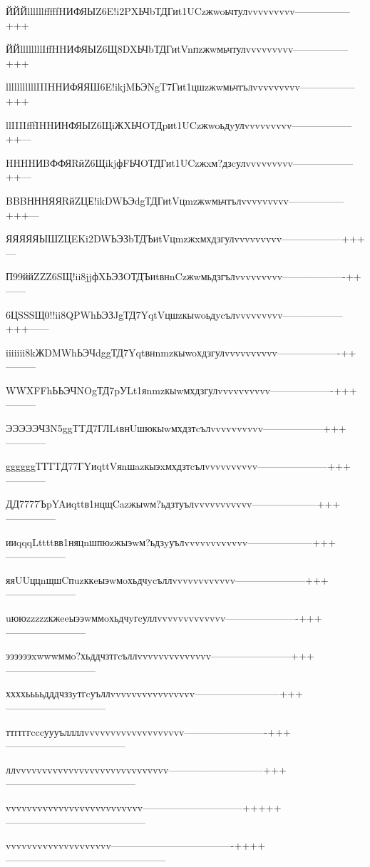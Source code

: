 \documentclass{article}
\begin{document}
 

ЙЙЙllllllfffffHИФЯЫZ6E!i2PXЬЧbТДГиt1UCzжwoьчтулvvvvvvvvv-----------------+++

ЙЙllllllllIffHHИФЯЫZ6Щ8DXЬЧbТДГиtVnпzжwмьчтулvvvvvvvvv-----------------+++

lllllllllllIIIHHИФЯЯШ6E!ikjMЬЭNgT7Гиt1цшzжwмьчтълvvvvvvvvv-----------------+++

llIIIIfffIHHИНФЯЫZ6ЩiЖXЬЧOТДpиt1UCzжwoьдyулvvvvvvvvv------------------++—

HHHHИBФФЯRйZ6ЩikjфFЬЧOТДГиt1UCzжxм?дзcулvvvvvvvvv------------------++—

BBBНННЯЯRйZЦЕ!ikDWЬЭdgТДГиtVцmzжwмьчтълvvvvvvvvv-----------------+++—

ЯЯЯЯЯЫШZЦEKi2DWЬЭЗbТДЪиtVцmzжxмхдзгулvvvvvvvvv------------------+++—

П99ййZZZ6SЩ!ii8jjфXЬЭЗOТДЪиtвнnCzжwмьдзгълvvvvvvvvv-------------------++——

6ЦSSSЩ0!!ii8QPWhЬЭЗJgТД7YqtVцшzкыwoьдycълvvvvvvvvv------------------+++——

iiiiiii8kЖDMWhЬЭЧdggТД7Yqtвнnmzкыwoхдзгулvvvvvvvvvv-------------------++———

WWXFFhЬЬЭЧNOgТД7pУLt1яnmzкыwмхдзгулvvvvvvvvvv-------------------+++———

ЭЭЭЭЭЧЗN5ggТTД7ГЛLtвнUшюкыwмхдзтcълvvvvvvvvvv------------------+++————

ggggggТТТTД77ГYиqttVяnшazкыэxмхдзтcълvvvvvvvvvv---------------------+++————

ДД7777ЪpYAиqttв1нцщCazжыwм?ьдзтуълvvvvvvvvvvv--------------------+++—————

ииqqqLttttвв1няцnшпюzжыэwм?ьдзyуълvvvvvvvvvvvv--------------------+++——————

яяUUццnщшCпuzккeыэwмoхьдчycъллvvvvvvvvvvvv---------------------+++———————

uююzzzzzкжeeыээwммoхьдчyгcуллvvvvvvvvvvvvv----------------------+++————————

ээээээxwwwммo?хьддчзтгcъллvvvvvvvvvvvvvv------------------------+++—————————

ххххььььдддчззyтгcуъллvvvvvvvvvvvvvvvv--------------------------+++——————————

ттггггcccуууъллллvvvvvvvvvvvvvvvvvvv-------------------------+++————————————

ллvvvvvvvvvvvvvvvvvvvvvvvvvvvvv-----------------------------+++—————————————

vvvvvvvvvvvvvvvvvvvvvvvvvv------------------------------+++++——————————————

vvvvvvvvvvvvvvvvvvvv-------------------------------------++++————————————————
\end{document}
